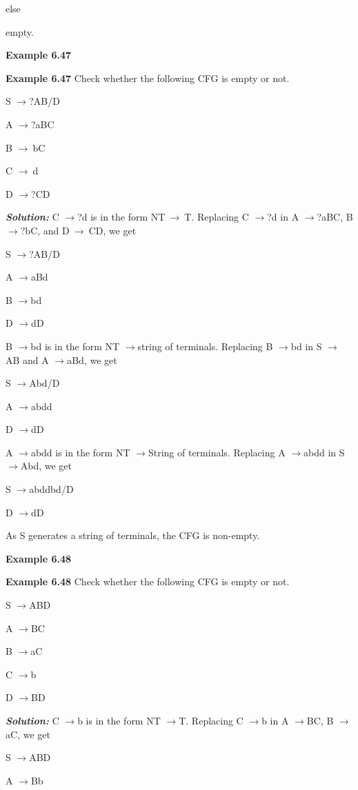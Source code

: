 \noindent else

\noindent empty.

\noindent \textbf{Example 6.47}

\noindent \textbf{Example 6.47 }Check whether the following CFG is empty or not.

\noindent S $\to $?AB/D

\noindent A $\to $?aBC

\noindent B $\to \ $bC

\noindent C $\to \ $d

\noindent D $\to $?CD

\noindent \textbf{\textit{Solution: }}C $\to $?d is in the form NT$\ \to \ $T. Replacing C $\to $?d in A $\to $?aBC, B $\to $?bC, and D$\ \to \ $CD, we get

\noindent S $\to $?AB/D

\noindent A $\to $aBd

\noindent B $\to $bd

\noindent D $\to $dD

\noindent B $\to $bd is in the form NT $\to $string of terminals. Replacing B $\to $bd in S $\to $AB and A $\to $aBd, we get

\noindent S $\to $Abd/D

\noindent A $\to $abdd

\noindent D $\to $dD

\noindent A $\to $abdd is in the form NT $\to $String of terminals. Replacing A $\to $abdd in S $\to $Abd, we get

\noindent S $\to $abddbd/D

\noindent D $\to $dD

\noindent As S generates a string of terminals, the CFG is non-empty.

\noindent \textbf{Example 6.48}

\noindent \textbf{Example 6.48 }Check whether the following CFG is empty or not.

\noindent S $\to $ABD

\noindent A $\to $BC

\noindent B $\to $aC

\noindent C $\to $b

\noindent D $\to $BD

\noindent \textbf{\textit{Solution: }}C $\to $b is in the form NT $\to $T. Replacing C $\to $b in A $\to $BC, B $\to $aC, we get

\noindent S $\to $ABD

\noindent A $\to $Bb

